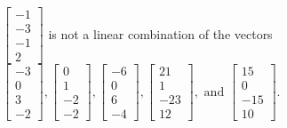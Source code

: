 \begin{exercise}
\begin{exerciseStatement}
  \end{exerciseStatement}
  \begin{exerciseAnswer}
   \(\left[\begin{array}{c}
-1 \\
-3 \\
-1 \\
2
\end{array}\right]\) 
  	 is not  
	a linear combination of the vectors \(\left[\begin{array}{c}
-3 \\
0 \\
3 \\
-2
\end{array}\right] , \left[\begin{array}{c}
0 \\
1 \\
-2 \\
-2
\end{array}\right] , \left[\begin{array}{c}
-6 \\
0 \\
6 \\
-4
\end{array}\right] , \left[\begin{array}{c}
21 \\
1 \\
-23 \\
12
\end{array}\right] , \text{ and } \left[\begin{array}{c}
15 \\
0 \\
-15 \\
10
\end{array}\right]\).

	
  


  \end{exerciseAnswer}
\end{exercise}